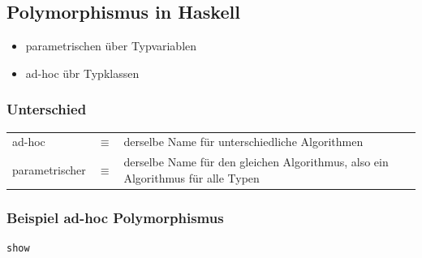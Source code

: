 
	\subsection{Polymorphismus in Haskell} %
	\label{sub:polymorphismus_in_haskell}
		\begin{itemize}
			\item parametrischen über Typvariablen
			\item ad-hoc übr Typklassen
		\end{itemize}

		\subsubsection*{Unterschied} %
		\label{ssub:unterschied}
			\begin{tabular}{lcp{8cm}}
				ad-hoc & $\equiv$ & derselbe Name für unterschiedliche Algorithmen\\
				parametrischer & $\equiv$ & derselbe Name für den gleichen Algorithmus, also ein Algorithmus für alle Typen
			\end{tabular}

		\subsubsection*{Beispiel ad-hoc Polymorphismus} %
		\label{ssub:beispiel_ad_hoc_polymorphismus}
					\lstHaskell
			\begin{lstlisting}
show
			\end{lstlisting}
